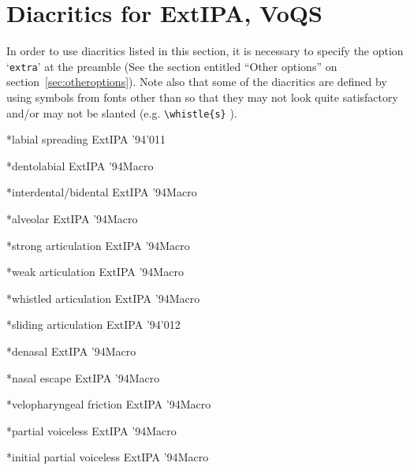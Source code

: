 \section{Diacritics for ExtIPA, VoQS}

In order to use diacritics listed in this section, it is necessary to
specify the option `\texttt{extra}' at the preamble (See the section
entitled ``Other options'' on section~\ref{sec:otheroptions}). Note
also that some of the diacritics are defined by using symbols from
fonts other than \tipa{} so that they may not look quite satisfactory
and/or may not be slanted (e.g. \verb|\whistle{s}| ).

\bigskip

%
  {*labial spreading}%
  {}{}{ExtIPA '94}{'011}

%
  {*dentolabial}%
  {}{}{ExtIPA '94}{Macro}

%
  {*interdental/bidental}%
  {}{}{ExtIPA '94}{Macro}

%
  {*alveolar}%
  {}{}{ExtIPA '94}{Macro}

%
  {*strong articulation}%
  {}{}{ExtIPA '94}{Macro}

%
  {*weak articulation}%
  {}{}{ExtIPA '94}{Macro}

%
  {*whistled articulation}%
  {}{}{ExtIPA '94}{Macro}

%
  {*sliding articulation}%
  {}{}{ExtIPA '94}{'012}

%
  {*denasal}%
  {}{}{ExtIPA '94}{Macro}

%
  {*nasal escape}%
  {}{}{ExtIPA '94}{Macro}

%
  {*velopharyngeal friction}%
  {}{}{ExtIPA '94}{Macro}

%
  {*partial voiceless}%
  {}{}{ExtIPA '94}{Macro}

%
  {*initial partial voiceless}%
  {}{}{ExtIPA '94}{Macro}

